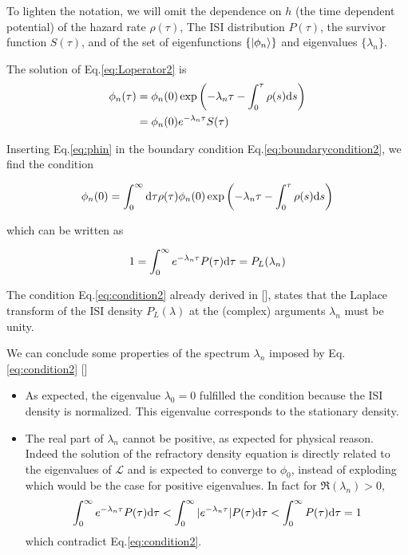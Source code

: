 \documentclass[12pt,twoside]{report}
\def \dd  {{\rm d}}
\begin{document}
To lighten the notation, we will omit the dependence on $h$ (the time dependent potential) of the hazard rate $\rho(\tau)$, The ISI distribution $P(\tau)$, the survivor function $S(\tau)$, and of the set of eigenfunctions $\{\ket{\phi_n}\}$ and eigenvalues $\{\lambda_n\}$.

The solution of Eq.\eqref{eq:Loperator2} is
\begin{align}
\label{eq:phin}
\phi_n(\tau)&=\phi_n(0)\exp\left(-\lambda_n\tau-\int_0^\tau\rho(s)\dd s\right)\nonumber\\
&=\phi_n(0)e^{-\lambda_n\tau}S(\tau)
\end{align}

Inserting Eq.\eqref{eq:phin} in the boundary condition Eq.\eqref{eq:boundarycondition2}, we find the condition

\begin{equation}
\label{eq:condition1}
\phi_n(0)=\int_0^\infty\dd\tau\rho(\tau)\phi_n(0)\exp\left(-\lambda_n\tau-\int_0^\tau\rho(s)\dd s\right)
\end{equation}

which can be written as

\begin{equation}
\label{eq:condition2}
1=\int_0^\infty e^{-\lambda_n \tau}P(\tau)\dd\tau=P_L(\lambda_n)\\
\end{equation}

The condition Eq.\eqref{eq:condition2} already derived in [\cite{Sch16}], states that the Laplace transform of the ISI density $P_L(\lambda)$ at the (complex) arguments $\lambda_{n}$ must be unity. 

We can conclude some properties of the spectrum {$\lambda_n$} imposed by Eq.\eqref{eq:condition2} [\cite{Sch16}]

\begin{itemize}
\item As expected, the eigenvalue $\lambda_0=0$ fulfilled the condition because the ISI density is normalized. This eigenvalue corresponds to the stationary density.
\item The real part of $\lambda_n$ cannot be positive, as expected for physical reason. Indeed the solution of the refractory density equation is directly related to the eigenvalues of $\mathcal{L}$ and is expected to converge to $\phi_0$, instead of exploding which would be the case for positive eigenvalues. In fact for $\Re(\lambda_n)>0$,\begin{equation}
\int_0^\infty e^{-\lambda_n \tau} P(\tau) \dd\tau<\int_0^\infty |e^{-\lambda_n\tau} |P(\tau) \dd\tau<\int_0^\infty P(\tau) \dd\tau=1
\end{equation}which contradict Eq.\eqref{eq:condition2}.
\end{itemize}
\end{document}
